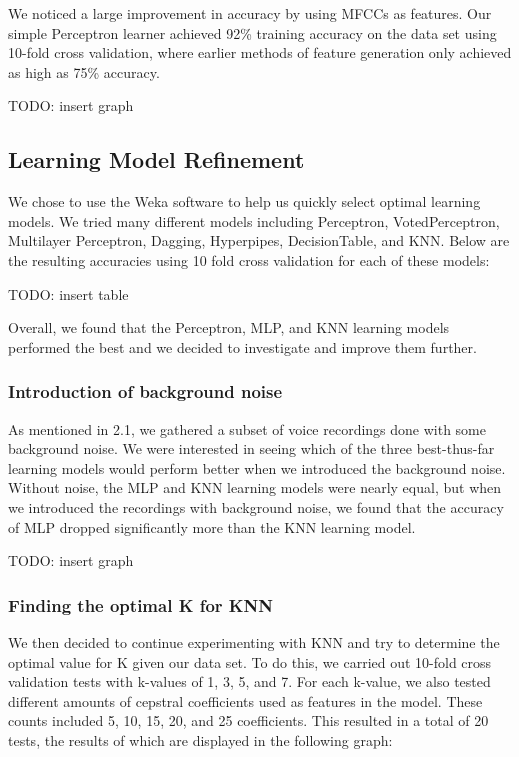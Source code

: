 \documentclass{article}
\begin{document}
We noticed a large improvement in accuracy by using MFCCs as features. Our simple Perceptron learner achieved 92\% training accuracy on the data set using 10-fold cross validation, where earlier methods of feature generation only achieved as high as 75\% accuracy.

TODO: insert graph

\subsection{Learning Model Refinement}

We chose to use the Weka software to help us quickly select optimal learning models. We tried many different models including Perceptron, VotedPerceptron, Multilayer Perceptron, Dagging, Hyperpipes, DecisionTable, and KNN. Below are the resulting accuracies using 10 fold cross validation for each of these models:

TODO: insert table

Overall, we found that the Perceptron, MLP, and KNN learning models performed the best and we decided to investigate and improve them further.

\subsubsection{Introduction of background noise}

As mentioned in 2.1, we gathered a subset of voice recordings done with some background noise. We were interested in seeing which of the three best-thus-far learning models would perform better when we introduced the background noise. Without noise, the MLP and KNN learning models were nearly equal, but when we introduced the recordings with background noise, we found that the accuracy of MLP dropped significantly more than the KNN learning model.

TODO: insert graph

\subsubsection{Finding the optimal K for KNN}

We then decided to continue experimenting with KNN and try to determine the optimal value for K given our data set.  To do this, we carried out 10-fold cross validation tests with k-values of 1, 3, 5, and 7.  For each k-value, we also tested different amounts of cepstral coefficients used as features in the model.  These counts included 5, 10, 15, 20, and 25 coefficients.  This resulted in a total of 20 tests, the results of which are displayed in the following graph:
\end{document}
